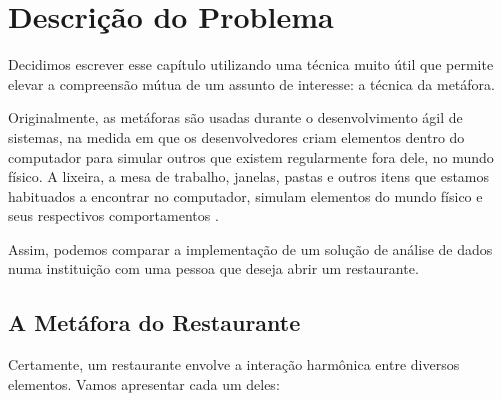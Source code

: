 \chapter{Descrição do Problema}
\label{cap-descricao}

Decidimos escrever esse capítulo utilizando uma técnica muito útil que permite elevar a compreensão mútua de um assunto de interesse: a técnica da metáfora. 

Originalmente, as metáforas são usadas durante o desenvolvimento ágil de sistemas, na medida em que os desenvolvedores criam elementos dentro do computador para simular outros que existem regularmente fora dele, no mundo físico.  A lixeira, a mesa de trabalho, janelas, pastas e outros itens que estamos habituados a encontrar no computador, simulam elementos do mundo físico e seus respectivos comportamentos \cite{intro:metafora}.

Assim, podemos comparar a implementação de um solução de análise de dados numa instituição com uma pessoa que deseja abrir um restaurante.

\section{A Metáfora do Restaurante}
\label{sec-metafora}

Certamente, um restaurante envolve a interação harmônica entre diversos elementos. Vamos apresentar cada um deles:

